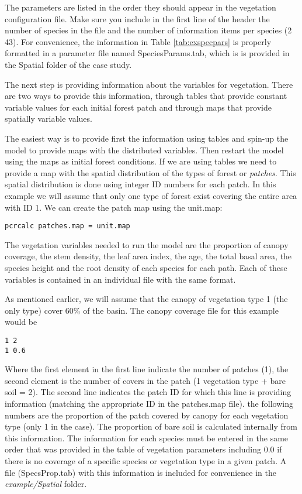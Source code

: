  
The parameters are listed in the order they should appear in the vegetation configuration file. Make sure you include in the first line of the header the number of species in the file and the number of information items per species (2 43). For convenience, the information in Table \ref{tab:exspecpars} is properly formatted in a parameter file named \textsf{SpeciesParams.tab}, which is is provided in the \textsf{Spatial} folder of the case study.

The next step is providing information about the variables for vegetation. There are two ways to provide this information, through tables that provide constant variable values for each initial forest patch and through maps that provide spatially variable values.
 
The easiest way is to provide first the information using tables and spin-up the model to provide maps with the distributed variables. Then restart the model using the maps as initial forest conditions. If we are using tables we need to provide a map with the spatial distribution of the types of forest or \textit{patches}. This spatial distribution is done using integer ID numbers for each patch. In this example we will assume that only one type of forest exist covering the entire area with ID 1. We can create the patch map using the unit.map:

\begin{verbatim}
pcrcalc patches.map = unit.map 
\end{verbatim}
   
The vegetation variables needed to run the model are the proportion of canopy coverage, the stem density, the leaf area index, the age, the total basal area, the species height and the root density of each species for each path. Each of these variables is contained in an individual file with the same format. 

As mentioned earlier, we will assume that the canopy of vegetation type 1 (the only type) cover 60\% of the basin. The canopy coverage file for this example would be

\begin{verbatim}
1 2
1 0.6
\end{verbatim}

Where the first element in the first line indicate the number of patches (1), the second element is the number of covers in the patch (1 vegetation type + bare soil = 2). The second line indicates the patch ID for which this line is providing information (matching the appropriate ID in the \textsf{patches.map} file). the following numbers are the proportion of the patch covered by canopy for each vegetation type (only 1 in the case). The proportion of bare soil is calculated internally from this information. The information for each species must be entered in the same order that was provided in the table of vegetation parameters including 0.0 if there is no coverage of a specific species or vegetation type in a given patch. A file (\textsf{SpecsProp.tab}) with this information is included for convenience in the \textit{example/Spatial} folder.

